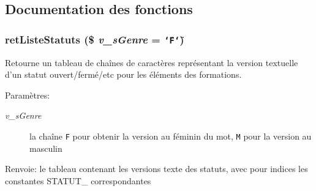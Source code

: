 \subsection{Documentation des fonctions}
\subsubsection{\setlength{\rightskip}{0pt plus 5cm}retListeStatuts (\$ {\em v\_\-sGenre} = {\tt \char`\"{}F\char`\"{}})}\label{plate__forme_8class_8php_47415fa8c613805277ff7e3fdf81d6d8}


Retourne un tableau de chaînes de caractères représentant la version textuelle d'un statut ouvert/fermé/etc pour les éléments des formations. 

\begin{Desc}
\item[Paramètres:]
\begin{description}
\item[{\em v\_\-sGenre}]la chaîne {\tt F} pour obtenir la version au féminin du mot, {\tt M} pour la version au masculin\end{description}
\end{Desc}
\begin{Desc}
\item[Renvoie:]le tableau contenant les versions texte des statuts, avec pour indices les constantes STATUT\_\- correspondantes \end{Desc}
